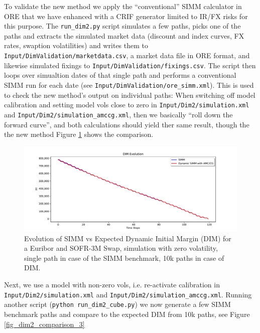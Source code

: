 To validate the new method we apply the ``conventional'' SIMM calculator in ORE that we have enhanced with a CRIF
generator limited to IR/FX risks for this purpose. The {\tt run\_dim2.py} script simulates a few paths, picks one
of the paths and extracts the simulated market data (discount and index curves, FX rates, swaption volatilities)
and writes them to {\tt Input/DimValidation/marketdata.csv}, a market data file in ORE format, and likewise simulated
fixings to {\tt Input/DimValidation/fixings.csv}. The script then loops over simualtion dates of that single path
and performs a conventional SIMM run for each date (see {\tt Input/DimValidation/ore\_simm.xml}).
This is used to check the new method's output on individual paths: When switching off model calibration and setting
model vols close to zero in {\tt Input/Dim2/simulation.xml} and {\tt Input/Dim2/simulation\_amccg.xml}, then we basically
``roll down the forward curve'', and both calculations should yield ther same result, though the the new method
Figure \ref{fig_dim2_comparison_1} shows the comparison.

\begin{figure}[h!]
\begin{center}
\includegraphics[scale=0.5]{examples/mpl_dim_comparison_1.pdf}
\end{center}
\caption{Evolution of SIMM vs Expected Dynamic Initial Margin (DIM) for a Euribor and SOFR-3M Swap, simulation with zero
  volatility, single path in case of the SIMM benchmark, 10k paths in case of DIM.}
\label{fig_dim2_comparison_1}
\end{figure}

Next, we use a model with non-zero vols, i.e. re-activate calibration in {\tt Input/Dim2/simulation.xml} and
{\tt Input/Dim2/simulation\_amccg.xml}. Running another script ({\tt python run\_dim2\_cube.py}) we now generate a few
SIMM benchmark paths and compare to the expected DIM from 10k paths, see Figure  \ref{fig_dim2_comparison_3}

